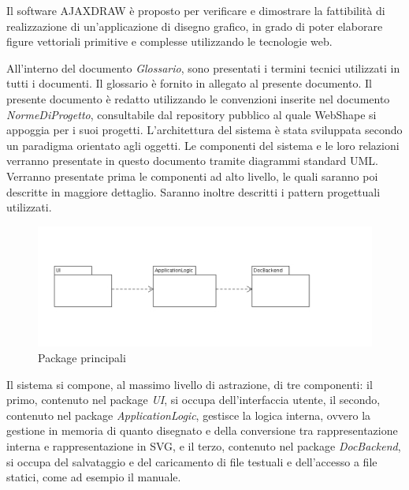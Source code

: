 Il software AJAXDRAW \`e proposto per verificare e dimostrare la fattibilit\`a di realizzazione di un'applicazione di disegno grafico, in grado di poter elaborare figure vettoriali primitive e complesse utilizzando le tecnologie web.

All'interno del documento \textit{Glossario}, sono presentati i termini tecnici utilizzati in tutti i documenti. Il glossario \`e fornito in allegato al presente documento.
Il presente documento \`e redatto utilizzando le convenzioni inserite nel documento \textit{NormeDiProgetto}, consultabile dal repository pubblico al quale WebShape si appoggia per i suoi progetti.
L'architettura del sistema \`e stata sviluppata secondo un paradigma orientato agli oggetti. Le componenti del sistema e le loro relazioni verranno presentate in questo documento tramite diagrammi standard UML. Verranno presentate prima le componenti ad alto livello, le quali saranno poi descritte in maggiore dettaglio. Saranno inoltre descritti i pattern progettuali utilizzati.

\begin{figure}[!ht]
\centering
\includegraphics{MainView.jpg}
\caption{Package principali}
\end{figure}

Il sistema si compone, al massimo livello di astrazione, di tre componenti: il primo, contenuto nel package \textit{UI}, si occupa dell'interfaccia utente, il secondo, contenuto nel package \textit{ApplicationLogic}, gestisce la logica interna, ovvero la gestione in memoria di quanto disegnato e della conversione tra rappresentazione interna e rappresentazione in SVG, e il terzo, contenuto nel package \textit{DocBackend}, si occupa del salvataggio e del caricamento di file testuali e dell'accesso a file statici, come ad esempio il manuale.
